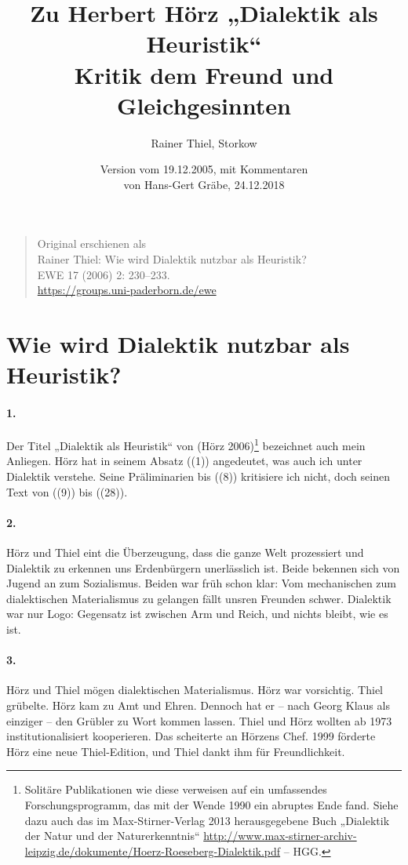 \documentclass[a4paper,11pt]{article}
\title{Zu Herbert Hörz „Dialektik als Heuristik“ \\[6pt] \large Kritik dem
  Freund und Gleichgesinnten}
\author{Rainer Thiel, Storkow}
\date{Version vom 19.12.2005, mit Kommentaren\\ von Hans-Gert Gräbe,
  24.12.2018}
\begin{document}
\maketitle
\begin{quote}
  Original erschienen als \\
  Rainer Thiel: Wie wird Dialektik nutzbar als Heuristik?\\
  EWE 17 (2006) 2: 230--233. \\
  \url{https://groups.uni-paderborn.de/ewe}
\end{quote}
\section*{Wie wird Dialektik nutzbar als Heuristik?}

\paragraph{1.}
Der Titel „Dialektik als Heuristik“ von (Hörz 2006)\footnote{Solitäre
  Publikationen wie diese verweisen auf ein umfassendes Forschungsprogramm,
  das mit der Wende 1990 ein abruptes Ende fand.  Siehe dazu auch das im
  Max-Stirner-Verlag 2013 herausgegebene Buch „Dialektik der Natur und der
  Naturerkenntnis“
  \url{http://www.max-stirner-archiv-leipzig.de/dokumente/Hoerz-Roeseberg-Dialektik.pdf}
  -- HGG.} bezeichnet auch mein Anliegen. Hörz hat in seinem Absatz ((1))
angedeutet, was auch ich unter Dialektik verstehe. Seine Präliminarien bis
((8)) kritisiere ich nicht, doch seinen Text von ((9)) bis ((28)).

\paragraph{2.}
Hörz und Thiel eint die Überzeugung, dass die ganze Welt prozessiert und
Dialektik zu erkennen uns Erdenbürgern unerlässlich ist. Beide bekennen sich
von Jugend an zum Sozialismus. Beiden war früh schon klar: Vom mechanischen
zum dialektischen Materialismus zu gelangen fällt unsren Freunden schwer.
Dialektik war nur Logo: Gegensatz ist zwischen Arm und Reich, und nichts
bleibt, wie es ist.

\paragraph{3.}
Hörz und Thiel mögen dialektischen Materialismus. Hörz war vorsichtig.  Thiel
grübelte. Hörz kam zu Amt und Ehren. Dennoch hat er -- nach Georg Klaus als
einziger -- den Grübler zu Wort kommen lassen. Thiel und Hörz wollten ab 1973
institutionalisiert kooperieren. Das scheiterte an Hörzens Chef. 1999 förderte
Hörz eine neue Thiel-Edition, und Thiel dankt ihm für Freundlichkeit.
\end{document}
